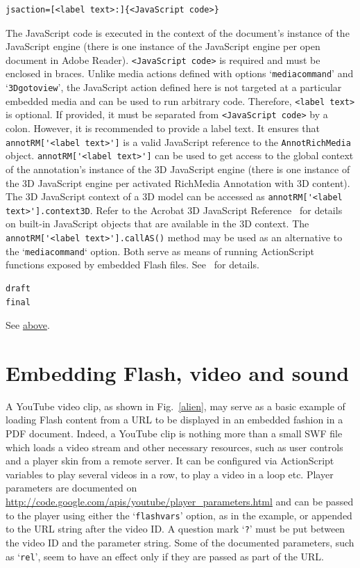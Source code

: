 \documentclass[a4paper]{article}
\begin{document}
\begin{verbatim}
jsaction=[<label text>:]{<JavaScript code>}
\end{verbatim}
The JavaScript code is executed in the context of the document's instance of the JavaScript engine (there is one instance of the JavaScript engine per open document in Adobe Reader). \verb+<JavaScript code>+ is required and must be enclosed in braces. Unlike media actions defined with options `\verb+mediacommand+' and `\verb+3Dgotoview+', the JavaScript action defined here is not targeted at a particular embedded media and can be used to run arbitrary code. Therefore, \verb+<label text>+ is optional. If provided, it must be separated from \verb+<JavaScript code>+ by a colon. However, it is recommended to provide a label text. It ensures that \verb+annotRM['<label text>']+ is a valid JavaScript reference to the \verb+AnnotRichMedia+ object. \verb+annotRM['<label text>']+ can be used to get access to the global context of the annotation's instance of the 3D JavaScript engine (there is one instance of the 3D JavaScript engine per activated RichMedia Annotation with 3D content). The 3D JavaScript context of a 3D model can be accessed as \verb+annotRM['<label text>'].context3D+. Refer to the Acrobat 3D JavaScript Reference~\cite{jscript3D} for details on built-in JavaScript objects that are available in the 3D context. The \verb+annotRM['<label text>'].callAS()+ method may be used as an alternative to the `\verb+mediacommand+` option. Both serve as means of running ActionScript functions exposed by embedded Flash files. See~\cite{jscript} for details.
\begin{verbatim}
draft
final
\end{verbatim}
See \hyperlink{draftfinal}{above}.

\clearpage
\section[Embedding Flash, video and sound (with examples)]{Embedding Flash, video and sound}
A YouTube video clip, as shown in Fig.~\ref{alien}, may serve as a basic example of loading Flash content from a URL to be displayed in an embedded fashion in a PDF document. Indeed, a YouTube clip is nothing more than a small SWF file which loads a video stream and other necessary resources, such as user controls and a player skin from a remote server. It can be configured via ActionScript variables to play several videos in a row, to play a video in a loop etc. Player parameters are documented on \url{http://code.google.com/apis/youtube/player_parameters.html} and can be passed to the player using either the `\verb+flashvars+' option, as in the example, or appended to the URL string after the video ID. A question mark `\verb+?+' must be put between the video ID and the parameter string. Some of the documented parameters, such as `\verb+rel+', seem to have an effect only if they are passed as part of the URL.
\end{document}
